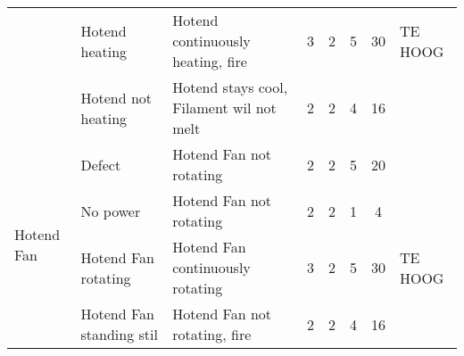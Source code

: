 \begin{landscape}
\begin{longtable}{|l|l|l|c|c|c|c|l|}
                                            & Hotend heating            & Hotend continuously heating, fire                 & 3 & 2 & 5 & 30 & TE HOOG \\
                                            & Hotend not heating        & Hotend stays cool, Filament wil not melt          & 2 & 2 & 4 & 16 & \\ 
                                            \hline
        \multirow{4}{*}{Hotend Fan}         & Defect                    & Hotend Fan not rotating                           & 2 & 2 & 5 & 20 & \\
                                            & No power                  & Hotend Fan not rotating                           & 2 & 2 & 1 &  4 & \\
                                            & Hotend Fan rotating       & Hotend Fan continuously rotating                  & 3 & 2 & 5 & 30 & TE HOOG \\
                                            & Hotend Fan standing stil  & Hotend Fan not rotating, fire                     & 2 & 2 & 4 & 16 & \\ 
                                            \hline   
    \end{longtable}
\end{landscape}